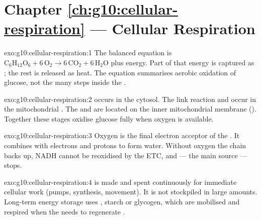 \section*{Chapter \ref{ch:g10:cellular-respiration} --- Cellular Respiration}

\begin{solution}{exo:g10:cellular-respiration:1}
The balanced equation is
$\mathrm{C_6H_{12}O_6}+6\,\mathrm{O_2}\to 6\,\mathrm{CO_2}+6\,\mathrm{H_2O}$
plus energy. Part of that energy is captured as ; the rest is released as
heat. The equation summarises aerobic oxidation of glucose, not the many
 steps inside the .
\end{solution}

\begin{solution}{exo:g10:cellular-respiration:2}
 occurs in the cytosol. The link reaction and  occur in
the mitochondrial . The  and  are located on the inner mitochondrial membrane ().
Together these stages oxidise glucose fully when oxygen is available.
\end{solution}

\begin{solution}{exo:g10:cellular-respiration:3}
Oxygen is the final electron acceptor of the . It
combines with electrons and protons to form water. Without oxygen the chain
backs up, NADH cannot be reoxidised by the ETC, and 
--- the main  source --- stops.
\end{solution}

\begin{solution}{exo:g10:cellular-respiration:4}
 is made and spent continuously for immediate cellular work (pumps,
synthesis, movement). It is not stockpiled in large amounts. Long-term energy
storage uses , starch or glycogen, which are mobilised and respired when
the  needs to regenerate .
\end{solution}

